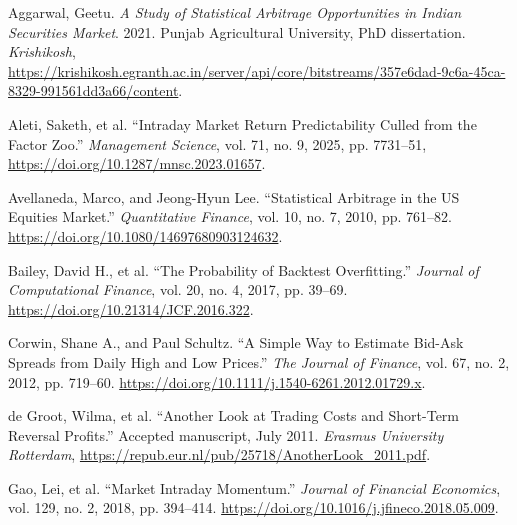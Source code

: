 \documentclass[11pt,a4paper]{article}
\begin{document}
{\RaggedRight\hangindent=1.27cm\noindent Aggarwal, Geetu. \textit{A Study of Statistical Arbitrage Opportunities in Indian Securities Market}. 2021. Punjab Agricultural University, PhD dissertation. \textit{Krishikosh}, \url{https://krishikosh.egranth.ac.in/server/api/core/bitstreams/357e6dad-9c6a-45ca-8329-991561dd3a66/content}.\par}\vspace{5pt}

{\RaggedRight\hangindent=1.27cm\noindent Aleti, Saketh, et al. “Intraday Market Return Predictability Culled from the Factor Zoo.” \textit{Management Science}, vol. 71, no. 9, 2025, pp. 7731--51, \url{https://doi.org/10.1287/mnsc.2023.01657}.\par}\vspace{5pt}

{\RaggedRight\hangindent=1.27cm\noindent Avellaneda, Marco, and Jeong-Hyun Lee. “Statistical Arbitrage in the US Equities Market.” \textit{Quantitative Finance}, vol. 10, no. 7, 2010, pp. 761–82. \url{https://doi.org/10.1080/14697680903124632}.\par}\vspace{5pt}

{\RaggedRight\hangindent=1.27cm\noindent Bailey, David H., et al. “The Probability of Backtest Overfitting.” \textit{Journal of Computational Finance}, vol. 20, no. 4, 2017, pp. 39–69. \url{https://doi.org/10.21314/JCF.2016.322}.\par}\vspace{5pt}

{\RaggedRight\hangindent=1.27cm\noindent Corwin, Shane A., and Paul Schultz. “A Simple Way to Estimate Bid-Ask Spreads from Daily High and Low Prices.” \textit{The Journal of Finance}, vol. 67, no. 2, 2012, pp. 719–60. \url{https://doi.org/10.1111/j.1540-6261.2012.01729.x}.\par}\vspace{5pt}

{\RaggedRight\hangindent=1.27cm\noindent de Groot, Wilma, et al. “Another Look at Trading Costs and Short-Term Reversal Profits.” Accepted manuscript, July 2011. \textit{Erasmus University Rotterdam}, \url{https://repub.eur.nl/pub/25718/AnotherLook_2011.pdf}.\par}\vspace{5pt}

{\RaggedRight\hangindent=1.27cm\noindent Gao, Lei, et al. “Market Intraday Momentum.” \textit{Journal of Financial Economics}, vol. 129, no. 2, 2018, pp. 394–414. \url{https://doi.org/10.1016/j.jfineco.2018.05.009}.\par}\vspace{5pt}
\end{document}
